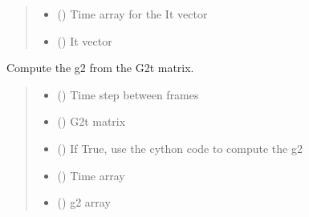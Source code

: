 \documentclass[letterpaper,10pt,english]{sphinxmanual}
\begin{document}
\begin{fulllineitems}
\begin{quote}
\begin{description}
\sphinxAtStartPar
\begin{itemize}
\item {} 
\sphinxAtStartPar
{} () \textendash{} Time array for the It vector

\item {} 
\sphinxAtStartPar
{} () \textendash{} It vector

\end{itemize}


\end{description}\end{quote}

\end{fulllineitems}


\begin{fulllineitems}
\label{\detokenize{index:XPCS_tools.get_g2}}
\pysigstartsignatures
\pysiglinewithargsret
{}
{\sphinxparamcomma {}\sphinxparamcomma {}}
{}
\pysigstopsignatures
\sphinxAtStartPar
Compute the g2 from the G2t matrix.
\begin{quote}\begin{description}
\begin{itemize}
\item {} 
\sphinxAtStartPar
{} () \textendash{} Time step between frames

\item {} 
\sphinxAtStartPar
{} () \textendash{} G2t matrix

\item {} 
\sphinxAtStartPar
{} () \textendash{} If True, use the cython code to compute the g2

\end{itemize}

\sphinxAtStartPar
\begin{itemize}
\item {} 
\sphinxAtStartPar
{} () \textendash{} Time array

\item {} 
\sphinxAtStartPar
{} () \textendash{} g2 array

\end{itemize}


\end{description}\end{quote}

\end{fulllineitems}
\end{document}
